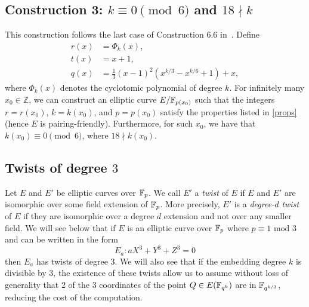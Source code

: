 \subsection{Construction 3: $k \equiv 0 \pmod{6}$ and $18 \nmid k$}
This construction follows the last case of Construction 6.6 in~\cite{2010/freeman}.
Define
\begin{align*}
r(x) &= \Phi_k(x),	\\
t(x) &= x+1,		\\
q(x) &= \frac{1}{3} (x-1)^2 (x^{k/3} - x^{k/6} + 1) + x,
\end{align*}
where $\Phi_{k}(x)$ denotes the cyclotomic polynomial of degree $k$. For infinitely many $x_{0}\in \mathbb{Z}$, we can construct an elliptic curve $E/\mathbb{F}_{p(x_{0})}$ such that the integers $r=r(x_{0})$, $k=k(x_{0})$, and $p=p(x_{0})$ satisfy the properties listed in \ref{props} (hence $E$ is pairing-friendly). Furthermore, for such $x_{0}$, we have that
$k(x_{0}) \equiv 0 \pmod{6}$, where $18 \nmid k(x_{0})$.



\subsection{Twists of degree $3$}
\label{twist}
Let $E$ and $E'$ be elliptic curves over $\mathbb{F}_{p}$.
We call $E'$ a \emph{twist} of $E$ if $E$ and $E'$ are isomorphic over some field extension of $\mathbb{F}_{p}$.
More precisely, $E'$ is a {\emph{degree-$d$ twist}} of $E$ if they are isomorphic over a degree $d$ extension and not over any smaller field. We will see below that if $E$ is an elliptic curve over $\mathbb{F}_{p}$ where $p \equiv 1 \text{ mod } 3$ and can be written in the form
\[E_{a}: aX^{3} + Y^{3} + Z^{3} = 0\]
then $E_{a}$ has twists of degree 3. We will also see that if the embedding degree $k$ is divisible by 3, the existence of these twists allow us to assume without loss of generality that 2 of the 3 coordinates of the point $Q \in E(\mathbb{F}_{q^{k}})$ are in $\mathbb{F}_{q^{k/3}}$, reducing the cost of the computation.

